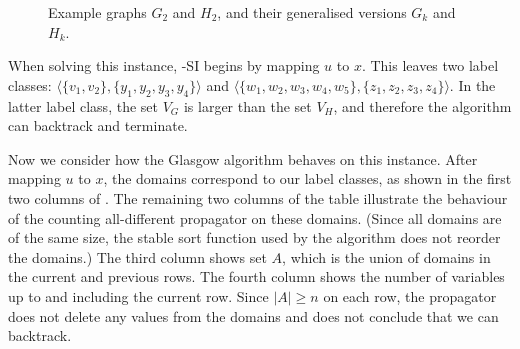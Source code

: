 \begin{figure}[htb]
{{        }
        \label{figure:gac-example-1}
    }
    \caption{Example graphs $G_2$ and $H_2$, and their generalised
    versions $G_k$ and $H_k$.}\label{figure:gac-example}
\end{figure}

When solving this instance, \McSplit-SI begins by mapping $u$ to $x$.  This leaves
two label classes:
$\langle \{v_1,v_2\}, \{y_1,y_2,y_3,y_4\} \rangle$
and
$\langle \{w_1,w_2,w_3,w_4,w_5\}, \{z_1,z_2,z_3,z_4\} \rangle$.  In the latter
label class, the set $V_G$ is larger than the set $V_H$, and therefore the
algorithm can backtrack and terminate.

Now we consider how the Glasgow algorithm behaves on this instance. After mapping
$u$ to $x$, the domains correspond to our label classes, as shown in the first two
columns of .  The remaining two columns of the table
illustrate the behaviour of the counting all-different propagator on these domains.
(Since all domains are of the same size, the stable sort function used by the algorithm
does not reorder the domains.)  The third column shows set $A$, which is the union
of domains in the current and previous rows.  The fourth column shows the number
of variables up to and including the current row.  Since $|A| \geq n$ on each row,
the propagator does not delete any values from the domains and does not conclude
that we can backtrack.

